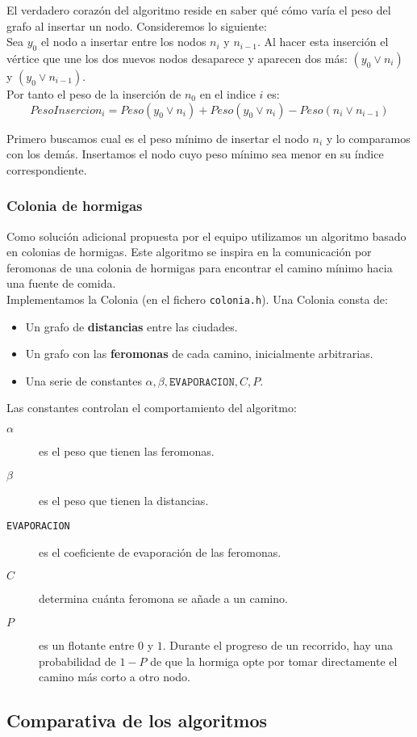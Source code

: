 
\newpage
El verdadero coraz\'on del algoritmo reside en saber qu\'e cómo varía el peso del grafo al insertar un nodo.
Consideremos lo siguiente: \\

Sea $y_0$ el nodo a insertar entre los nodos $n_i$ y $n_{i-1}$. Al hacer esta inserción el vértice que une los dos nuevos nodos desaparece y aparecen dos más: $(y_0 \vee n_i)$ y $(y_0 \vee n_{i-1})$.\\

Por tanto el peso de la inserción de $n_0$ en el indice $i$ es:
$$ PesoInsercion_i = Peso(y_0 \vee n_i)+Peso(y_0 \vee n_i)-Peso(n_i\vee n_{i-1})$$

Primero buscamos cual es el peso mínimo de insertar el nodo $n_i$ y lo comparamos con los demás. Insertamos el nodo cuyo peso mínimo sea menor en su índice correspondiente.



\subsubsection{Colonia de hormigas}

Como solución adicional propuesta por el equipo utilizamos un algoritmo basado en
colonias de hormigas. Este algoritmo se inspira en la comunicación por feromonas
de una colonia de hormigas para encontrar el camino mínimo hacia una fuente de comida. \\

Implementamos la Colonia (en el fichero \texttt{colonia.h}). Una Colonia consta de:

\begin{itemize}
  \item Un grafo de \textbf{distancias} entre las ciudades.
  \item Un grafo con las \textbf{feromonas} de cada camino, inicialmente arbitrarias.
  \item Una serie de constantes $\alpha, \beta, \texttt{EVAPORACION}, C, P$.
\end{itemize}

Las constantes controlan el comportamiento del algoritmo:

\begin{description}
  \item[$\alpha$] es el peso que tienen las feromonas.
  \item[$\beta$] es el peso que tienen la distancias.
  \item[\texttt{EVAPORACION}] es el coeficiente de evaporación de las feromonas.
  \item[$C$] determina cuánta feromona se añade a un camino.
  \item[$P$] es un flotante entre $0$ y $1$. Durante el progreso de un recorrido, hay
  una probabilidad de $1-P$ de que la hormiga opte por tomar directamente el camino
  más corto a otro nodo.
\end{description}

\subsection{Comparativa de los algoritmos}
